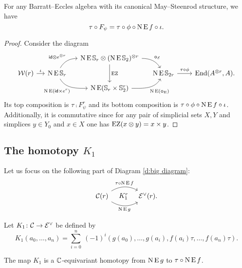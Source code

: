 \begin{lemma}\label{l:K0}
	For any Barratt--Eccles algebra with its canonical May--Steenrod structure, we have
	\[
	\tau \mathbin{\circ} F_\psi = \tau \mathbin{\circ} \phi \mathbin{\circ} \operatorname{N}\operatorname{E} f \mathbin{\circ} \iota.
	\]
\end{lemma}

\begin{proof}
	Consider the diagram
	\begin{equation*}\label{d:F and f}
		\begin{tikzcd}[column sep=small,row sep=tiny]
			&& \chains\EE\sym_r \ot (\chains\EE\sym_2)^{\ot r}
			\arrow[dr,"\bcomp_{\BE}",out=0,in=120]
			\arrow[dd,"\EZ"] &&[10pt] \\
			\cW(r) \arrow[r,"\iota"] &
			\chains\EE\sym_r
			\arrow[ur,"\id \ot e^{\ot r}", out=60,in=180]
			\arrow[dr,"\chains\EE(\id \times e^r)"',out=-60,in=180]
			& & \chains\EE\sym_{2r} \arrow[r,"\tau\comp\phi"] &
			\End(A^{\ot r}, A). \\
			&& \chains\EE(\sym_r \times \sym_2^r)
			\arrow[ur, "\chains\EE(\bcomp_{\EE})"', out=0,in=-120]
			&
		\end{tikzcd}
	\end{equation*}
	Its top composition is $\tau \comp F_\psi^r$ and its bottom composition is $\tau \mathbin{\circ} \phi \mathbin{\circ} \operatorname{N}\operatorname{E} f \mathbin{\circ} \iota$.
	Additionally, it is commutative since for any pair of simplicial sets $X,Y$ and simplices $y \in Y_0$ and $x \in X$ one has $\operatorname{EZ}(x \otimes y) = x \times y$.
\end{proof}

\subsection{The homotopy $K_1$}\label{ss:K1}

Let us focus on the following part of Diagram \eqref{d:big diagram}:
\[
\begin{tikzcd}[column sep=large]
	\cC(r)
	\arrow[r,bend left,"\tau \comp \chains\EE f"]
	\arrow[r,bend right,"\chains\EE g"']
	\arrow[r,phantom,"K_1^r"]
	& \BE^\vee(r).
\end{tikzcd}
\]

\begin{definition}
	Let $K_1 \colon \mathcal{C} \to \mathcal{E}^\vee$ be defined by
	\[
	K_1(a_0,\dots,a_n) =
	\sum_{i=0}^n \ (-1)^i (g(a_0), \dots, g(a_i), f(a_i) \tau, \dots, f(a_n) \tau).
	\]
\end{definition}

\begin{lemma}\label{l:K1}
	The map $K_1$ is a $\mathbb{C}$-equivariant homotopy from $\operatorname{N} \operatorname{E} g$ to $\tau \mathbin{\circ} \operatorname{N} \operatorname{E} f$.
\end{lemma}

